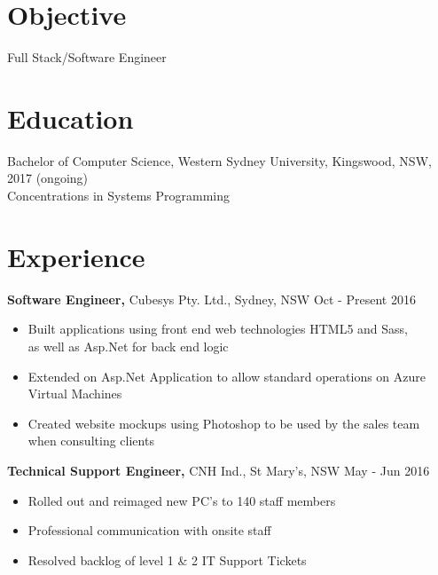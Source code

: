 \documentclass[margin]{res}
\begin{document}

\address{{\bf Present Address} \\ 10 Joseph Street \\ Kingswood, NSW 2747  \\
        0414329597 }
\address{{\bf Email Address} \\ ben.hili1994@gmail.com }


\begin{resume}

\section{Objective}
Full Stack/Software Engineer

\section{Education}
Bachelor of Computer Science, Western Sydney University, Kingswood, NSW, 2017 (ongoing) \\
Concentrations in Systems Programming

\section{Experience}
 {\bf Software Engineer,} Cubesys Pty. Ltd., Sydney, NSW \hfill Oct - Present 2016
 \begin{itemize} \itemsep 0pt  %
 \item Built applications using front end web technologies HTML5 and Sass, \\
       as well as Asp.Net for back end logic

 \item Extended on Asp.Net Application to allow standard operations on Azure \\
       Virtual Machines

 \item Created website mockups using Photoshop to be used by the sales team \\
      when consulting clients
 \end{itemize}



{\bf Technical Support Engineer,} CNH Ind., St Mary's, NSW \hfill  May - Jun 2016
\begin{itemize} \itemsep -2pt %
\item Rolled out and reimaged new PC's to 140 staff members
\item Professional communication with onsite staff
\item Resolved backlog of level 1 \& 2 IT Support Tickets
\end{itemize}


\end{resume}
\end{document}
